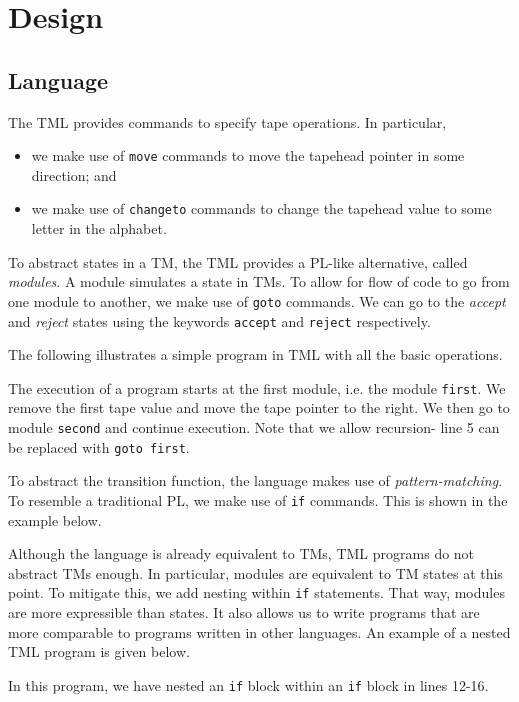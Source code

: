 \chapter{Design}
\section{Language}

The TML provides commands to specify tape operations. In particular, 
\begin{itemize}
    \item we make use of \texttt{move} commands to move the tapehead pointer in some direction; and
    \item we make use of \texttt{changeto} commands to change the tapehead value to some letter in the alphabet.
\end{itemize}
To abstract states in a TM, the TML provides a PL-like alternative, called \emph{modules}. A module simulates a state in TMs. To allow for flow of code to go from one module to another, we make use of \texttt{goto} commands. We can go to the \textit{accept} and \textit{reject} states using the keywords \texttt{accept} and \texttt{reject} respectively.

The following illustrates a simple program in TML with all the basic operations.

The execution of a program starts at the first module, i.e. the module \texttt{first}. We remove the first tape value and move the tape pointer to the right. We then go to module \texttt{second} and continue execution. Note that we allow recursion- line 5 can be replaced with \texttt{goto first}.

To abstract the transition function, the language makes use of \emph{pattern-matching}. To resemble a traditional PL, we make use of \texttt{if} commands. This is shown in the example below.


Although the language is already equivalent to TMs, TML programs do not abstract TMs enough. In particular, modules are equivalent to TM states at this point. To mitigate this, we add nesting within \texttt{if} statements. That way, modules are more expressible than states. It also allows us to write programs that are more comparable to programs written in other languages. An example of a nested TML program is given below.

In this program, we have nested an \texttt{if} block within an \texttt{if} block in lines 12-16.

